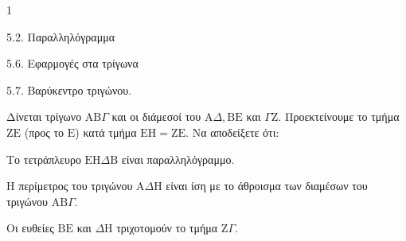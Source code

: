 \begin{ylh}{1}
    \item 5.2. Παραλληλόγραμμα
    \item 5.6. Εφαρμογές στα τρίγωνα
    \item 5.7. Βαρύκεντρο τριγώνου.
\end{ylh}
Δίνεται τρίγωνο $\mathrm{A}\mathrm{B}\Gamma$ και οι διάμεσοί του $\mathrm{A}\Delta, \mathrm{B}\mathrm{E}$ και $\Gamma\mathrm{Z}$. Προεκτείνουμε το τμήμα $\mathrm{Z}\mathrm{E}$ (προς το $\mathrm{E}$) κατά τμήμα $\mathrm{E}\mathrm{H} = \mathrm{Z}\mathrm{E}$.
Να αποδείξετε ότι:
\begin{alist}
    \item Το τετράπλευρο $\mathrm{E}\mathrm{H}\Delta\mathrm{B}$ είναι παραλληλόγραμμο. 
    \item Η περίμετρος του τριγώνου $\mathrm{A}\Delta\mathrm{H}$ είναι ίση με το άθροισμα των διαμέσων του τριγώνου $\mathrm{A}\mathrm{B}\Gamma$. 
    \item Οι ευθείες $\mathrm{B}\mathrm{E}$ και $\Delta\mathrm{H}$ τριχοτομούν το τμήμα $\mathrm{Z}\Gamma$. 
\end{alist}
